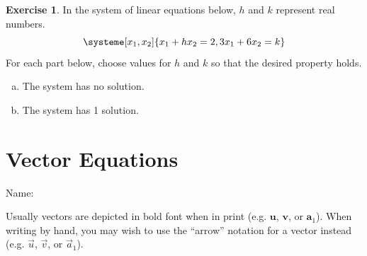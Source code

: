 \documentclass[10pt]{book}
\newcommand{\boxcolor}{gray!30}
\newenvironment{boxme}{\begin{mdframed}[backgroundcolor=\boxcolor,linewidth=0pt,nobreak=true]}{\end{mdframed}}
\theoremstyle{definition}
\newtheorem{exercise}{Exercise}[section]
\newcommand{\name}[1][2.5in]{\vspace{-2.3em}\hfill Name: \underline{\hspace{#1}}}
\newcommand{\vect}[1]{\ensuremath{\boldsymbol{\mathbf{#1}}}}
\begin{document}
\begin{exercise} %
In the system of linear equations below, $h$ and $k$ represent real numbers.
\[\systeme[x_1,x_2]{
	 x_1	+	hx_2	= 2,
	3x_1	+	6x_2	= k
	}
\]
For each part below, choose values for $h$ and $k$ so that the desired property holds.
\begin{multicols}{2}
	\begin{enumerate}[(a)]
		\item The system has no solution.
		\item The system has 1 solution.
	\end{enumerate}
\end{multicols}
\end{exercise}
\vfill


\newpage


\section{Vector Equations}
\name

\begin{boxme}
Usually vectors are depicted in bold font when in print (e.g. $\textbf{u}$, $\textbf{v}$, or $\vect{a}_1$). When writing by hand, you may wish to use the ``arrow'' notation for a vector instead (e.g. $\vec{u}$, $\vec{v}$, or $\vec{a}_1$).
\end{boxme}
\end{document}
